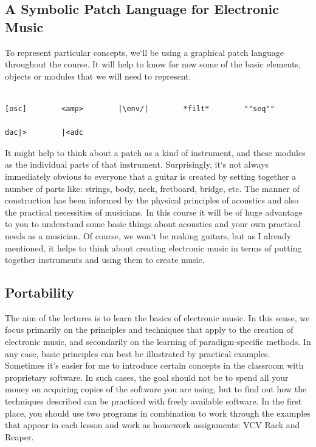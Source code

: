 \documentclass[11pt]{article}
\begin{document}
\subsection{A Symbolic Patch Language for Electronic Music}
\label{sec:org207227b}

To represent particular concepts, we‘ll be using a graphical patch
language  throughout the course. It will help to know for now some of
the basic elements, objects or modules that we will need to
represent. 

\begin{verbatim}

[osc]        <amp>        |\env/|        *filt*        °°seq°°        

dac|>        |<adc

\end{verbatim}


It might help to think about a patch as a kind of instrument, and these modules as the individual parts of that instrument. Surprisingly, it‘s not always immediately obvious to everyone that a guitar is created by setting together a number of parts like: strings, body, neck, fretboard, bridge, etc. The manner of construction has been informed by the physical principles of acoustics and also the practical necessities of musicians. In this course it will be of huge advantage to you to understand some basic things about acoustics and your own practical needs as a musician. Of course, we won‘t be making guitars, but as I already mentioned, it helps to think about creating electronic music in terms of putting together instruments and using them to create music. 

\subsection{Portability}
\label{sec:org262e6dd}
The aim of the lectures is to learn the basics of electronic music. In this sense, we focus primarily on the principles and techniques that apply to the creation of electronic music, and secondarily on the learning of paradigm-specific methods.
In any case, basic principles can best be illustrated by practical examples. Sometimes it's easier for me to introduce certain concepts in the classroom with proprietary software. In such cases, the goal should not be to spend all your money on acquiring copies of the software you are using, but to find out how the techniques described can be practiced with freely available software. In the first place, you should use two programs in combination to work through the examples that appear in each lesson and work as homework assignments: VCV Rack and Reaper. 
\end{document}
